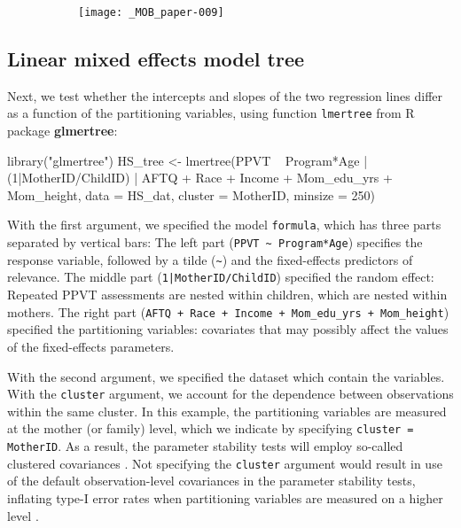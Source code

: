 \documentclass[doc,floatsintext,natbib]{apa7}
\begin{document}
\begin{figure}%
\caption{}
\begin{subfigure}{.7\textwidth}
\texttt{[image: \_MOB\_paper-009]}
\end{subfigure}
\label{fig:global_lmm}
\end{figure}%

\FloatBarrier
\subsection{Linear mixed effects model tree}

Next, we test whether the intercepts and slopes of the two regression lines differ as a function of the partitioning variables, using function \verb|lmertree| from R package \textbf{glmertree}:

\begin{Schunk}
\begin{Sinput}
 library("glmertree")
 HS_tree <- lmertree(PPVT ~ Program*Age | (1|MotherID/ChildID) | AFTQ + Race + 
                       Income + Mom_edu_yrs + Mom_height, 
                     data = HS_dat, cluster = MotherID, minsize = 250)
\end{Sinput}
\end{Schunk}

With the first argument, we specified the model \verb|formula|, which has three parts separated by vertical bars: The left part (\verb|PPVT ~ Program*Age|) specifies the response variable, followed by a tilde (\verb|~|) and the fixed-effects predictors of relevance. The middle part (\texttt{1|MotherID/ChildID}) specified the random effect: Repeated PPVT assessments are nested within children, which are nested within mothers. The right part (\verb|AFTQ + Race + Income + Mom_edu_yrs + Mom_height|) specified the partitioning variables: covariates that may possibly affect the values of the fixed-effects parameters. 

With the second argument, we specified the dataset which contain the variables. With the \texttt{cluster} argument, we account for the dependence between observations within the same cluster. In this example, the partitioning variables are measured at the mother (or family) level, which we indicate by specifying \texttt{cluster = MotherID}. As a result, the parameter stability tests will employ so-called clustered covariances \citep{ZeilyKoll20}. Not specifying the \texttt{cluster} argument would result in use of the default observation-level covariances in the parameter stability tests, inflating type-I error rates when partitioning variables are measured on a higher level \citep{FokkyZeil23}. 
 
\end{document}
